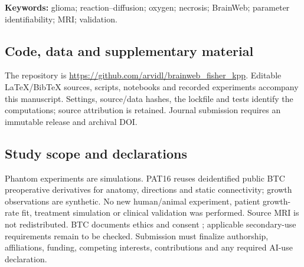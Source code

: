 \documentclass[11pt,a4paper]{article}
\begin{document}
\begin{abstract}
\noindent\textbf{Conclusions.} Oxygen feedback can alter modeled interiors despite similar threshold-defined extent. Conditional two-, three- and four-parameter recovery is feasible under known initialization and imaging assumptions, including joint tissue migration and anisotropy. Noise-based intervals omit anatomy, direction, initialization and model error. Synthetic recovery and MRI integration do not establish patient growth-rate recovery, biological validation or clinical forecasting performance.
\end{abstract}
\noindent\textbf{Keywords:} glioma; reaction--diffusion; oxygen; necrosis; BrainWeb; parameter identifiability; MRI; validation.




\subsection*{Code, data and supplementary material}
The repository is \url{https://github.com/arvidl/brainweb_fisher_kpp}. Editable LaTeX/BibTeX sources, scripts, notebooks and recorded experiments accompany this manuscript. Settings, source/data hashes, the lockfile and tests identify the computations; source attribution is retained. Journal submission requires an immutable release and archival DOI.
\subsection*{Study scope and declarations}
Phantom experiments are simulations. PAT16 reuses deidentified public BTC preoperative derivatives for anatomy, directions and static connectivity; growth observations are synthetic. No new human/animal experiment, patient growth-rate fit, treatment simulation or clinical validation was performed. Source MRI is not redistributed. BTC documents ethics and consent \citep{aerts2022}; applicable secondary-use requirements remain to be checked. Submission must finalize authorship, affiliations, funding, competing interests, contributions and any required AI-use declaration.
\clearpage
\appendix

\clearpage


\end{document}
